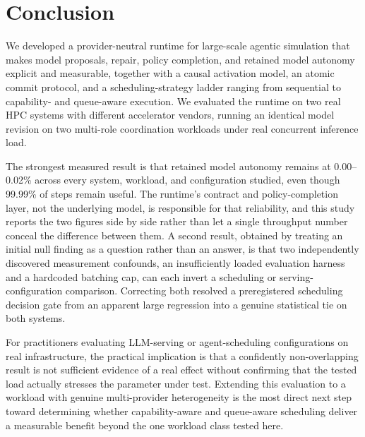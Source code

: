 \section{Conclusion}
\label{sec:conclusion}

We developed a provider-neutral runtime for large-scale agentic simulation that makes model proposals, repair, policy completion, and retained model autonomy explicit and measurable, together with a causal activation model, an atomic commit protocol, and a scheduling-strategy ladder ranging from sequential to capability- and queue-aware execution. We evaluated the runtime on two real HPC systems with different accelerator vendors, running an identical model revision on two multi-role coordination workloads under real concurrent inference load.

The strongest measured result is that retained model autonomy remains at 0.00--0.02\% across every system, workload, and configuration studied, even though 99.99\% of steps remain useful. The runtime's contract and policy-completion layer, not the underlying model, is responsible for that reliability, and this study reports the two figures side by side rather than let a single throughput number conceal the difference between them. A second result, obtained by treating an initial null finding as a question rather than an answer, is that two independently discovered measurement confounds, an insufficiently loaded evaluation harness and a hardcoded batching cap, can each invert a scheduling or serving-configuration comparison. Correcting both resolved a preregistered scheduling decision gate from an apparent large regression into a genuine statistical tie on both systems.

For practitioners evaluating LLM-serving or agent-scheduling configurations on real infrastructure, the practical implication is that a confidently non-overlapping result is not sufficient evidence of a real effect without confirming that the tested load actually stresses the parameter under test. Extending this evaluation to a workload with genuine multi-provider heterogeneity is the most direct next step toward determining whether capability-aware and queue-aware scheduling deliver a measurable benefit beyond the one workload class tested here.
